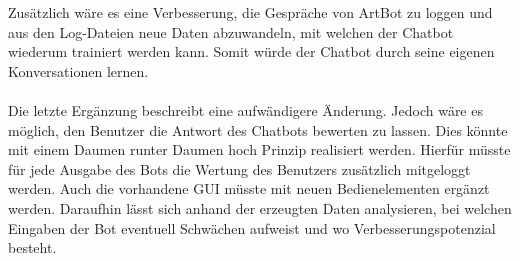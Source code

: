Zusätzlich wäre es eine Verbesserung, die Gespräche von ArtBot zu loggen und aus den Log-Dateien neue Daten abzuwandeln, mit welchen der Chatbot wiederum trainiert werden kann. Somit würde der Chatbot durch seine eigenen Konversationen lernen.\\
\\
Die letzte Ergänzung beschreibt eine aufwändigere Änderung. Jedoch wäre es möglich, den Benutzer die Antwort des Chatbots bewerten zu lassen. Dies könnte mit einem Daumen runter Daumen hoch Prinzip realisiert werden. Hierfür müsste für jede Ausgabe des Bots die Wertung des Benutzers zusätzlich mitgeloggt werden. Auch die vorhandene GUI müsste mit neuen Bedienelementen ergänzt werden. Daraufhin lässt sich anhand der erzeugten Daten analysieren, bei welchen Eingaben der Bot eventuell Schwächen aufweist und wo Verbesserungspotenzial besteht.

